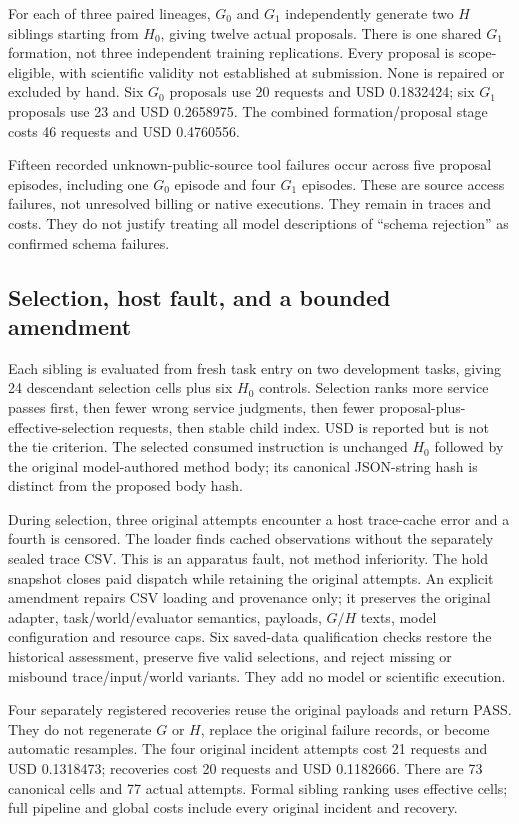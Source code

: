 For each of three paired lineages, $G_0$ and $G_1$ independently generate two
$H$ siblings starting from $H_0$, giving twelve actual proposals. There is one
shared $G_1$ formation, not three independent training replications. Every
proposal is scope-eligible, with scientific validity not established at
submission. None is repaired or excluded by hand. Six $G_0$ proposals use
20 requests and USD 0.1832424; six $G_1$ proposals use 23 and USD 0.2658975.
The combined formation/proposal stage costs 46 requests and USD 0.4760556.

Fifteen recorded unknown-public-source tool failures occur across five proposal
episodes, including one $G_0$ episode and four $G_1$ episodes. These are source
access failures, not unresolved billing or native executions. They remain in
traces and costs. They do not justify treating all model descriptions of
``schema rejection'' as confirmed schema failures.

\subsection{Selection, host fault, and a bounded amendment}
Each sibling is evaluated from fresh task entry on two development tasks,
giving 24 descendant selection cells plus six $H_0$ controls. Selection ranks
more service passes first, then fewer wrong service judgments, then fewer
proposal-plus-effective-selection requests, then stable child index. USD is
reported but is not the tie criterion. The selected consumed instruction is
unchanged $H_0$ followed by the original model-authored method body; its
canonical JSON-string hash is distinct from the proposed body hash.

During selection, three original attempts encounter a host trace-cache error
and a fourth is censored. The loader finds cached observations without the
separately sealed trace CSV. This is an apparatus fault, not method inferiority.
The hold snapshot closes paid dispatch while retaining the original attempts.
An explicit amendment repairs CSV loading and provenance only; it preserves
the original adapter, task/world/evaluator semantics, payloads, $G/H$ texts,
model configuration and resource caps. Six saved-data qualification checks
restore the historical assessment, preserve five valid selections, and reject
missing or misbound trace/input/world variants. They add no model or scientific
execution.

Four separately registered recoveries reuse the original payloads and return
PASS. They do not regenerate $G$ or $H$, replace the original failure records,
or become automatic resamples. The four original incident attempts cost 21
requests and USD 0.1318473; recoveries cost 20 requests and USD 0.1182666.
There are 73 canonical cells and 77 actual attempts. Formal sibling ranking
uses effective cells; full pipeline and global costs include every original
incident and recovery.

